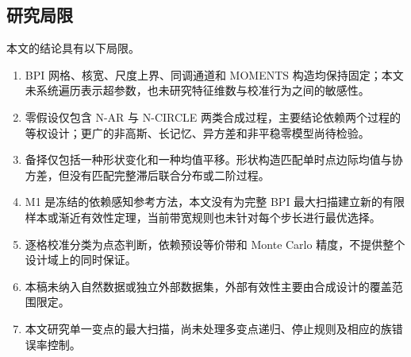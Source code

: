 \subsection{研究局限}\label{sec:limitations}

本文的结论具有以下局限。
\begin{enumerate}
\item BPI 网格、核宽、尺度上界、同调通道和 MOMENTS 构造均保持固定；本文未系统遍历表示超参数，也未研究特征维数与校准行为之间的敏感性。
\item 零假设仅包含 N-AR 与 N-CIRCLE 两类合成过程，主要结论依赖两个过程的等权设计；更广的非高斯、长记忆、异方差和非平稳零模型尚待检验。
\item 备择仅包括一种形状变化和一种均值平移。形状构造匹配单时点边际均值与协方差，但没有匹配完整滞后联合分布或二阶过程。
\item M1 是冻结的依赖感知参考方法，本文没有为完整 BPI 最大扫描建立新的有限样本或渐近有效性定理，当前带宽规则也未针对每个步长进行最优选择。
\item 逐格校准分类为点态判断，依赖预设等价带和 Monte Carlo 精度，不提供整个设计域上的同时保证。
\item 本稿未纳入自然数据或独立外部数据集，外部有效性主要由合成设计的覆盖范围限定。
\item 本文研究单一变点的最大扫描，尚未处理多变点递归、停止规则及相应的族错误率控制。
\end{enumerate}
